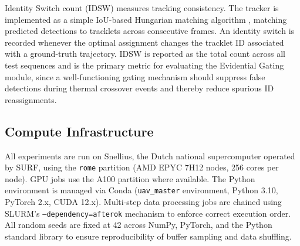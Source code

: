 \documentclass[nolinenumbering]{thesisdesign}
\begin{document}
Identity Switch count (IDSW) measures tracking consistency. The tracker is implemented as a simple IoU-based Hungarian matching algorithm \citep{aharon2022bot}, matching predicted detections to tracklets across consecutive frames. An identity switch is recorded whenever the optimal assignment changes the tracklet ID associated with a ground-truth trajectory. IDSW is reported as the total count across all test sequences and is the primary metric for evaluating the Evidential Gating module, since a well-functioning gating mechanism should suppress false detections during thermal crossover events and thereby reduce spurious ID reassignments.


\subsection{Compute Infrastructure}
\label{sec:infrastructure}

All experiments are run on Snellius, the Dutch national supercomputer operated by SURF, using the \texttt{rome} partition (AMD EPYC 7H12 nodes, 256 cores per node). GPU jobs use the A100 partition where available. The Python environment is managed via Conda (\texttt{uav\_master} environment, Python 3.10, PyTorch 2.x, CUDA 12.x). Multi-step data processing jobs are chained using SLURM's \texttt{--dependency=afterok} mechanism to enforce correct execution order. All random seeds are fixed at 42 across NumPy, PyTorch, and the Python standard library to ensure reproducibility of buffer sampling and data shuffling.




\end{document}
